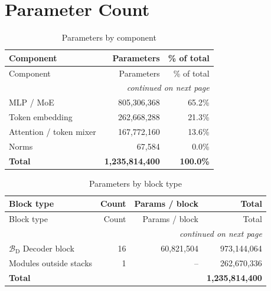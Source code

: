 \documentclass[10pt,a4paper]{article}
\theoremstyle{definition}
\begin{document}
\section{Parameter Count}
\begin{longtable}{lrr}
\caption{Parameters by component}\\
\toprule
Component & Parameters & \% of total \\
\midrule
\endfirsthead
\toprule
Component & Parameters & \% of total \\
\midrule
\endhead
\midrule \multicolumn{3}{r}{\textit{continued on next page}} \\
\endfoot
\bottomrule
\endlastfoot
MLP / MoE & 805,306,368 & 65.2\% \\
Token embedding & 262,668,288 & 21.3\% \\
Attention / token mixer & 167,772,160 & 13.6\% \\
Norms & 67,584 & 0.0\% \\
\midrule \textbf{Total} & \textbf{1,235,814,400} & \textbf{100.0\%} \\
\end{longtable}
\begin{longtable}{p{8cm}rrr}
\caption{Parameters by block type}\\
\toprule
Block type & Count & Params / block & Total \\
\midrule
\endfirsthead
\toprule
Block type & Count & Params / block & Total \\
\midrule
\endhead
\midrule \multicolumn{4}{r}{\textit{continued on next page}} \\
\endfoot
\bottomrule
\endlastfoot
$\mathcal{B}_{\mathrm{D}}$ Decoder block & 16 & 60,821,504 & 973,144,064 \\
Modules outside stacks & 1 & -- & 262,670,336 \\
\midrule \textbf{Total} & & & \textbf{1,235,814,400} \\
\end{longtable}
\end{document}
